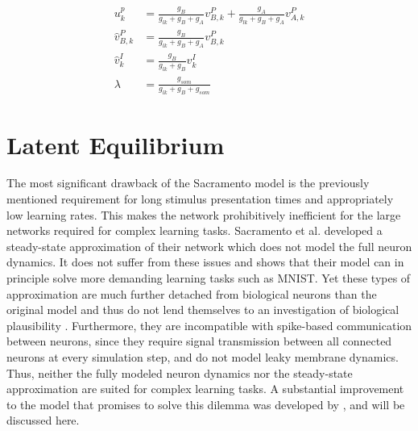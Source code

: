 \begin{align}
  u_k^p           & = \frac{g_B}{g_{lk} + g_B + g_A} v^P_{B,k} + \frac{g_A}{g_{lk} + g_B + g_A} v^P_{A,k} \\
  \hat{v}^P_{B,k} & = \frac{g_B}{g_{lk} + g_B + g_A} v^P_{B,k}                                            \\
  \hat{v}^I_{k}   & = \frac{g_B}{g_{lk} + g_B} v^I_{k}                                                    \\
  \lambda         & = \frac{g_{som}}{g_{lk} + g_B + g_{som}}
\end{align}



\section{Latent Equilibrium}\label{sec-haider}

The most significant drawback of the Sacramento model is the previously mentioned requirement for long stimulus
presentation times and appropriately low learning rates. This makes the network prohibitively inefficient for the large
networks required for complex learning tasks. Sacramento et al. developed a steady-state approximation of their network
which does not model the full neuron dynamics. It does not suffer from these issues and shows that their model can in
principle solve more demanding learning tasks such as MNIST. Yet these types of approximation are much further detached
from biological neurons than the original model and thus do not lend themselves to an investigation of biological
plausibility \citep{Gerstner2009}. Furthermore, they are incompatible with spike-based communication between neurons,
since they require signal transmission between all connected neurons at every simulation step, and do not model leaky
membrane dynamics. Thus, neither the fully modeled neuron dynamics nor the steady-state approximation are suited for
complex learning tasks. A substantial improvement to the model that promises to solve this dilemma was developed by
\cite{Haider2021}, and will be discussed here.
\newline

